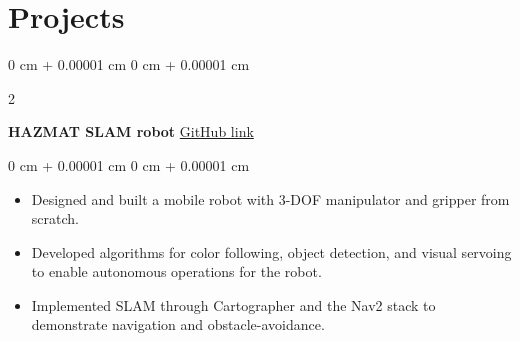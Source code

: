 \documentclass[10pt, letterpaper]{article}
\newenvironment{highlights}{
    \begin{itemize}[
        topsep=0.10 cm,
        parsep=0.10 cm,
        partopsep=0pt,
        itemsep=0pt,
        leftmargin=0 cm + 10pt
    ]
}{
    \end{itemize}
} %
\newenvironment{onecolentry}{
    \begin{adjustwidth}{
        0 cm + 0.00001 cm
    }{
        0 cm + 0.00001 cm
    }
}{
    \end{adjustwidth}
} %
\newenvironment{twocolentry}[2][]{
    \onecolentry
    \def\secondColumn{#2}
    \setcolumnwidth{\fill, 4.5 cm}
    \begin{paracol}{2}
}{
    \switchcolumn \raggedleft \secondColumn
    \end{paracol}
    \endonecolentry
} %
\begin{document}
   


    
    \section{Projects}

        \begin{twocolentry}{
            \href{https://github.com/abdulmaajidaga/B39VS-Systems-Project/}{GitHub link}
        }
            \textbf{HAZMAT SLAM robot}\end{twocolentry}

        \vspace{0.10 cm}
        \begin{onecolentry}
            \begin{highlights}
            \item Designed and built a mobile robot with 3-DOF manipulator and gripper from scratch.
            \item Developed algorithms for color following, object detection, and visual servoing to enable autonomous operations for the robot.
            \item Implemented SLAM through Cartographer and the Nav2 stack to demonstrate navigation and obstacle-avoidance.
            \end{highlights}
        \end{onecolentry}
        
\end{document}
